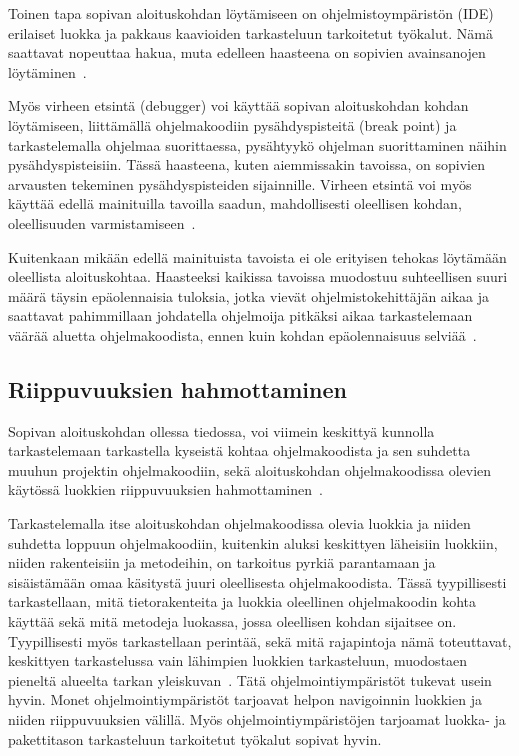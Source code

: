 \documentclass[finnish]{../tktltiki2}
\theoremstyle{definition}
\theoremstyle{remark}
\begin{document}
Toinen tapa sopivan aloituskohdan löytämiseen on ohjelmistoympäristön (IDE) erilaiset luokka ja pakkaus kaavioiden tarkasteluun tarkoitetut työkalut. Nämä saattavat nopeuttaa hakua, muta edelleen haasteena on sopivien avainsanojen löytäminen~\cite{what-to-search-for}.

Myös virheen etsintä (debugger) voi käyttää sopivan aloituskohdan kohdan löytämiseen, liittämällä ohjelmakoodiin pysähdyspisteitä (break point) ja tarkastelemalla ohjelmaa suorittaessa, pysähtyykö ohjelman suorittaminen näihin pysähdyspisteisiin. Tässä haasteena, kuten aiemmissakin tavoissa, on sopivien arvausten tekeminen pysähdyspisteiden sijainnille.
Virheen etsintä voi myös käyttää edellä mainituilla tavoilla saadun, mahdollisesti oleellisen kohdan, oleellisuuden varmistamiseen~\cite{eliciting-design-requirements-for-maintenance-oriented-ides}.

Kuitenkaan mikään edellä mainituista tavoista ei ole erityisen tehokas löytämään oleellista aloituskohtaa. Haasteeksi kaikissa tavoissa muodostuu suhteellisen suuri määrä täysin epäolennaisia tuloksia, jotka vievät ohjelmistokehittäjän aikaa ja saattavat pahimmillaan johdatella ohjelmoija pitkäksi aikaa tarkastelemaan väärää aluetta ohjelmakoodista, ennen kuin kohdan epäolennaisuus selviää~\cite{eliciting-design-requirements-for-maintenance-oriented-ides}.

\subsection{Riippuvuuksien hahmottaminen}
Sopivan aloituskohdan ollessa tiedossa, voi viimein keskittyä kunnolla tarkastelemaan tarkastella kyseistä kohtaa ohjelmakoodista ja sen suhdetta muuhun projektin ohjelmakoodiin, sekä aloituskohdan ohjelmakoodissa olevien käytössä luokkien riippuvuuksien hahmottaminen~\cite{questions-during-software-evolution-tasks}. %

Tarkastelemalla itse aloituskohdan ohjelmakoodissa olevia luokkia ja niiden suhdetta loppuun ohjelmakoodiin, kuitenkin aluksi keskittyen läheisiin luokkiin, niiden rakenteisiin ja metodeihin, on tarkoitus pyrkiä parantamaan ja sisäistämään omaa käsitystä juuri oleellisesta ohjelmakoodista. Tässä tyypillisesti tarkastellaan, mitä tietorakenteita ja luokkia oleellinen ohjelmakoodin kohta käyttää sekä mitä metodeja luokassa, jossa oleellisen kohdan sijaitsee on. Tyypillisesti myös tarkastellaan perintää, sekä mitä rajapintoja nämä toteuttavat, keskittyen tarkastelussa vain lähimpien luokkien tarkasteluun, muodostaen pieneltä alueelta tarkan yleiskuvan~\cite{questions-during-software-evolution-tasks}.
Tätä ohjelmointiympäristöt tukevat usein hyvin. Monet ohjelmointiympäristöt tarjoavat helpon navigoinnin luokkien ja niiden riippuvuuksien välillä. Myös ohjelmointiympäristöjen tarjoamat luokka- ja pakettitason tarkasteluun tarkoitetut työkalut sopivat hyvin.
\end{document}
